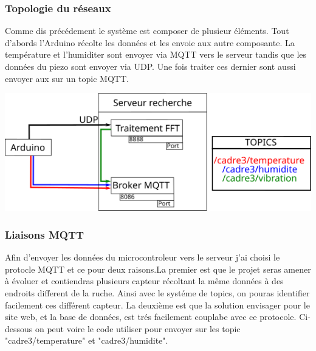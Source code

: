 \documentclass[11pt,french,a4paper]{article}
\begin{document}
\subsubsection{Topologie du réseaux}
Comme dis précédement le système est composer de plusieur éléments. Tout d'abords l'Arduino récolte les données et les envoie aux autre composante. La température et l'humiditer sont envoyer via MQTT vers le serveur tandis que les données du piezo sont envoyer via UDP. Une fois traiter ces dernier sont aussi envoyer aux sur un topic MQTT.
\begin{center}
    \includegraphics[scale=1]{../img/schemaNet.png}
    \label{SN}
\end{center}
\subsubsection{Liaisons MQTT}
Afin d'envoyer les données du microcontroleur vers le serveur j'ai choisi le protocle MQTT et ce pour deux raisons.La premier est que le projet seras amener à évoluer et contiendras plusieurs capteur récoltant la même données à des endroits different de la ruche. Ainsi avec le systéme de topics, on pouras identifier facilement ces différent capteur. La deuxième est que la solution envisager pour le site web, et la base de données, est trés facilement couplabe avec ce protocole. 
Ci-dessous on peut voire le code utiliser pour envoyer sur les topic "cadre3/temperature" et "cadre3/humidite". 
\end{document}
